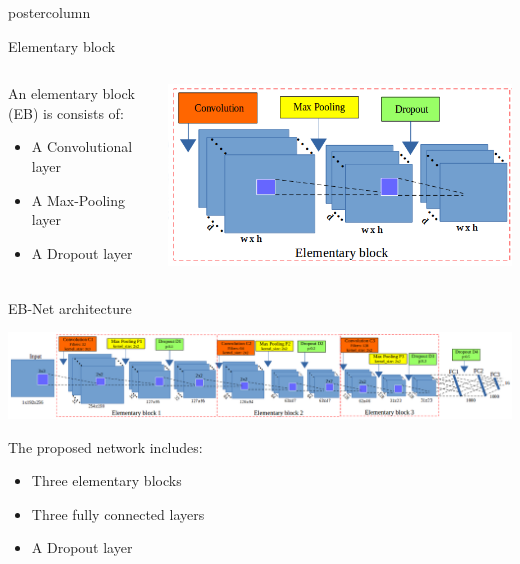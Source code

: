 \begin{frame}
\begin{columns}
\begin{column}{.49\textwidth}
\begin{beamercolorbox}[center,wd=\textwidth]{postercolumn}
\begin{minipage}[T]{.95\textwidth}
{            \begin{block}{Elementary block}
            	\begin{columns}
            		\begin{column}{.45\textwidth}
            			An elementary block (EB) is consists of:
            			\begin{itemize}
            				\item A Convolutional layer
            				\item A Max-Pooling layer
            				\item A Dropout layer
            			\end{itemize}
            		\end{column}
            		\begin{column}{.54\textwidth}
            			\centering
            			\includegraphics[width=.85\textwidth]{images/elementary_block.png}
            		\end{column}
            	\end{columns}
            \end{block}
            
            \vfill
            
            \begin{block}{EB-Net architecture}
            	\begin{center}
            		\includegraphics[width=.96\textwidth]{images/net3.png}\\
            	\end{center}
            The proposed network includes:
            \begin{itemize}
            	\item Three elementary blocks
            	\item Three fully connected layers
            	\item A Dropout layer
            \end{itemize}
            \end{block}
  
}
\end{minipage}
\end{beamercolorbox}
\end{column}
\end{columns}
\end{frame}

